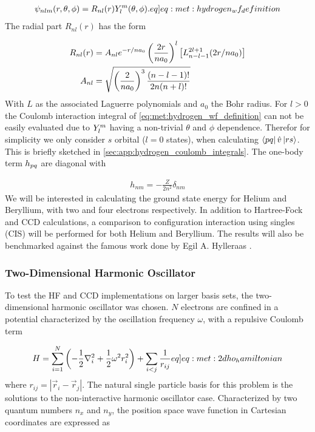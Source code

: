 \begin{align}
    \psi_{nlm}(r,\theta,\phi) = R_{nl}(r) \sphericalharmonic{m}{l}(\theta, \phi). \label[eq]{eq:met:hydrogen_wf_definition}
\end{align}
The radial part $R_{nl}(r)$ has the form

\begin{align*}
    R_{nl}(r) &= A_{nl} e^{-r/na_0} \left(\frac{2r}{na_0}\right)^l \left[L^{2l+1}_{n-l-1}(2r/na_0)\right] \\
    A_{nl} &= \sqrt{ \left(\frac{2}{na_0}\right)^3 \frac{(n-l-1)!}{2n(n+l)!} }
\end{align*}
With $L$ as the associated Laguerre polynomials and $a_0$ the Bohr radius. For $l > 0$ the Coulomb interaction integral of \cref{eq:met:hydrogen_wf_definition} can not be easily evaluated due to $Y^{m}_{l}$ having a non-trivial $\theta$ and $\phi$ dependence. Therefor for simplicity we only consider $s$ orbital ($l=0$ states), when calculating $\bra{pq}\hat{v}\ket{rs}$. This is briefly sketched in \cref{sec:app:hydrogen_coulomb_integrals}. The one-body term $h_{pq}$ are diagonal with 

\begin{align}
    h_{nm} = -\frac{Z}{2n^2}\delta_{nm}
\end{align}
We will be interested in calculating the ground state energy for Helium and Beryllium, with two and four electrons respectively. In addition to Hartree-Fock and CCD calculations, a comparison to configuration interaction using singles (CIS) will be performed for both Helium and Beryllium. The results will also be benchmarked against the famous work done by Egil A. Hylleraas \citep{hylleraasNumerischeBerechnung2STerme1930}.

\subsubsection{Two-Dimensional Harmonic Oscillator}
To test the HF and CCD implementations on larger basis sets, the two-dimensional harmonic oscillator was chosen. $N$ electrons are confined in a potential characterized by the oscillation frequency $\omega$, with a repulsive Coulomb term

\begin{align}
    H = \sum_{i=1}^N \pclosed{-\frac{1}{2}\nabla_i^2 + \frac{1}{2}\omega^2 r_i^2} + \sum_{i < j} \frac{1}{r_{ij}} \label[eq]{eq:met:2dho_hamiltonian}
\end{align}
where $r_{ij} = |\vec{r}_i - \vec{r}_j|$. The natural single particle basis for this problem is the solutions to the non-interactive harmonic oscillator case. Characterized by two quantum numbers $n_x$ and $n_y$, the position space wave function in Cartesian coordinates are expressed as 

